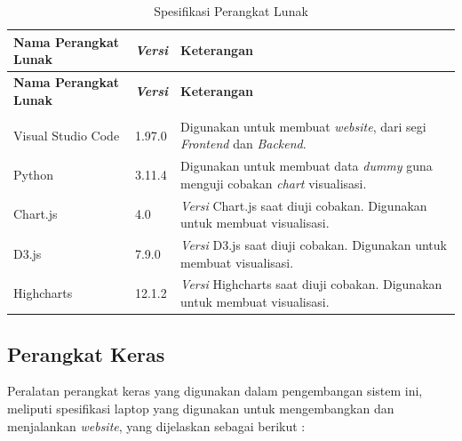 \begin{longtable}{|p{}|
		p{}|
		p{}|}
	\caption{Spesifikasi Perangkat Lunak} \label{t_risetPemodelan} \\
	
	\hline
	\textbf{Nama Perangkat Lunak} & \textbf{\textit{Versi}} & \textbf{Keterangan} \\ \hline
	\endfirsthead
	
	\hline
	\textbf{Nama Perangkat Lunak} & \textbf{\textit{Versi}} & \textbf{Keterangan} \\ \hline
	\endhead
	
	\hline \multicolumn{3}{r}{} \\ 
	\endfoot
	
	\hline
	\endlastfoot
	
	Visual Studio Code & 1.97.0 & Digunakan untuk membuat \textit{website}, dari segi \textit{Frontend} dan \textit{Backend}. \\ \hline
	
	Python & 3.11.4 & Digunakan untuk membuat data \textit{dummy} guna menguji cobakan \textit{chart} visualisasi. \\ \hline
	
	Chart.js & 4.0 & \textit{Versi} Chart.js saat diuji cobakan. Digunakan untuk membuat visualisasi. \\ \hline
	
	D3.js & 7.9.0 & \textit{Versi} D3.js saat diuji cobakan. Digunakan untuk membuat visualisasi. \\ \hline
	
	Highcharts & 12.1.2 & \textit{Versi} Highcharts saat diuji cobakan. Digunakan untuk membuat visualisasi. \\ \hline
	
\end{longtable}


\subsection{Perangkat Keras}
Peralatan perangkat keras yang digunakan dalam pengembangan sistem ini, meliputi spesifikasi laptop yang digunakan untuk mengembangkan dan menjalankan \textit{website}, yang dijelaskan sebagai berikut :  

